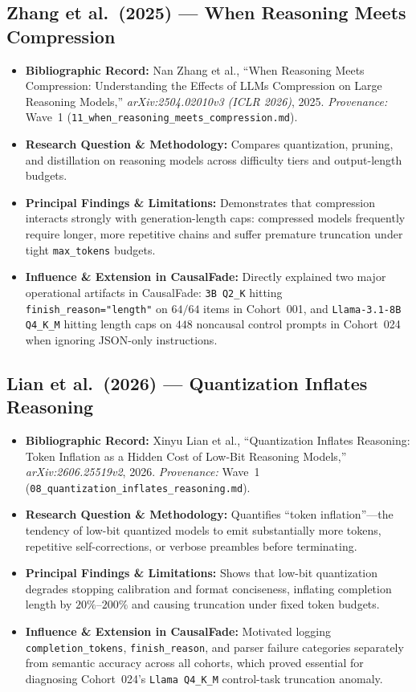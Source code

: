 \subsection{Zhang et al.\ (2025) --- When Reasoning Meets Compression \citep{zhang2025compression}}
\begin{itemize}
  \item \textbf{Bibliographic Record:} Nan Zhang et al., ``When Reasoning Meets Compression: Understanding the Effects of LLMs Compression on Large Reasoning Models,'' \emph{arXiv:2504.02010v3 (ICLR 2026)}, 2025. \emph{Provenance:} Wave~1 (\texttt{11\_when\_reasoning\_meets\_compression.md}).
  \item \textbf{Research Question \& Methodology:} Compares quantization, pruning, and distillation on reasoning models across difficulty tiers and output-length budgets.
  \item \textbf{Principal Findings \& Limitations:} Demonstrates that compression interacts strongly with generation-length caps: compressed models frequently require longer, more repetitive chains and suffer premature truncation under tight \texttt{max\_tokens} budgets.
  \item \textbf{Influence \& Extension in CausalFade:} Directly explained two major operational artifacts in CausalFade: \texttt{3B Q2\_K} hitting \texttt{finish\_reason="length"} on $64/64$ items in Cohort~001, and \texttt{Llama-3.1-8B Q4\_K\_M} hitting length caps on $448$ noncausal control prompts in Cohort~024 when ignoring JSON-only instructions.
\end{itemize}

\subsection{Lian et al.\ (2026) --- Quantization Inflates Reasoning \citep{lian2026inflates}}
\begin{itemize}
  \item \textbf{Bibliographic Record:} Xinyu Lian et al., ``Quantization Inflates Reasoning: Token Inflation as a Hidden Cost of Low-Bit Reasoning Models,'' \emph{arXiv:2606.25519v2}, 2026. \emph{Provenance:} Wave~1 (\texttt{08\_quantization\_inflates\_reasoning.md}).
  \item \textbf{Research Question \& Methodology:} Quantifies ``token inflation''---the tendency of low-bit quantized models to emit substantially more tokens, repetitive self-corrections, or verbose preambles before terminating.
  \item \textbf{Principal Findings \& Limitations:} Shows that low-bit quantization degrades stopping calibration and format conciseness, inflating completion length by $20\%$--$200\%$ and causing truncation under fixed token budgets.
  \item \textbf{Influence \& Extension in CausalFade:} Motivated logging \texttt{completion\_tokens}, \texttt{finish\_reason}, and parser failure categories separately from semantic accuracy across all cohorts, which proved essential for diagnosing Cohort~024's \texttt{Llama Q4\_K\_M} control-task truncation anomaly.
\end{itemize}

